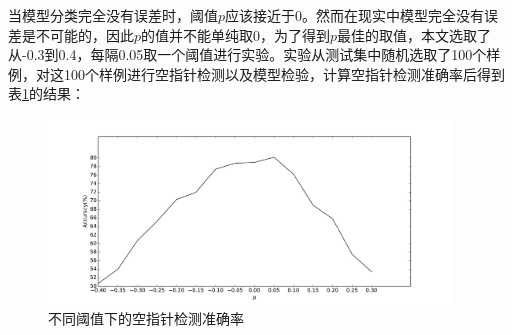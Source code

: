 当模型分类完全没有误差时，阈值$p$应该接近于0。然而在现实中模型完全没有误差是不可能的，因此$p$的值并不能单纯取0，为了得到$p$最佳的取值，本文选取了从-0.3到0.4，每隔0.05取一个阈值进行实验。实验从测试集中随机选取了100个样例，对这100个样例进行空指针检测以及模型检验，计算空指针检测准确率后得到表\ref{res}的结果：
\begin{figure}[htbp]
	\begin{center}
		\includegraphics[width=0.95\textwidth]{figures//10.pdf}
		\caption{不同阈值下的空指针检测准确率}
		\label{res}
	\end{center}
\end{figure}
